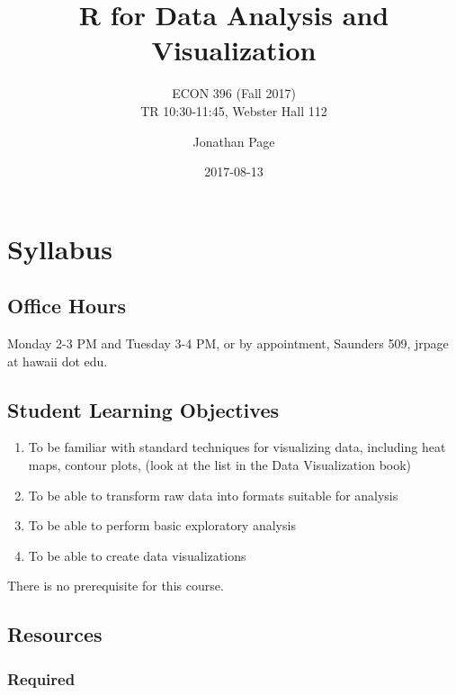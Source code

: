 \documentclass[]{book}
\title{R for Data Analysis and Visualization}
\subtitle{ECON 396 (Fall 2017)\\
TR 10:30-11:45, Webster Hall 112}
\author{Jonathan Page}
\date{2017-08-13}
\providecommand{\tightlist}{%
  \setlength{\itemsep}{0pt}\setlength{\parskip}{0pt}}
\theoremstyle{definition}
\theoremstyle{definition}
\theoremstyle{remark}
\begin{document}
\maketitle

{
\setcounter{tocdepth}{1}
\tableofcontents
}
\chapter*{Syllabus}\label{syllabus}

\section*{Office Hours}\label{office-hours}

Monday 2-3 PM and Tuesday 3-4 PM, or by appointment, Saunders 509,
jrpage at hawaii dot edu.

\section*{Student Learning
Objectives}\label{student-learning-objectives}

\begin{enumerate}
\def\labelenumi{\arabic{enumi}.}
\tightlist
\item
  To be familiar with standard techniques for visualizing data,
  including heat maps, contour plots, (look at the list in the Data
  Visualization book)
\item
  To be able to transform raw data into formats suitable for analysis
\item
  To be able to perform basic exploratory analysis
\item
  To be able to create data visualizations
\end{enumerate}

There is no prerequisite for this course.

\section*{Resources}\label{resources}

\subsection*{Required}\label{required}
\end{document}
